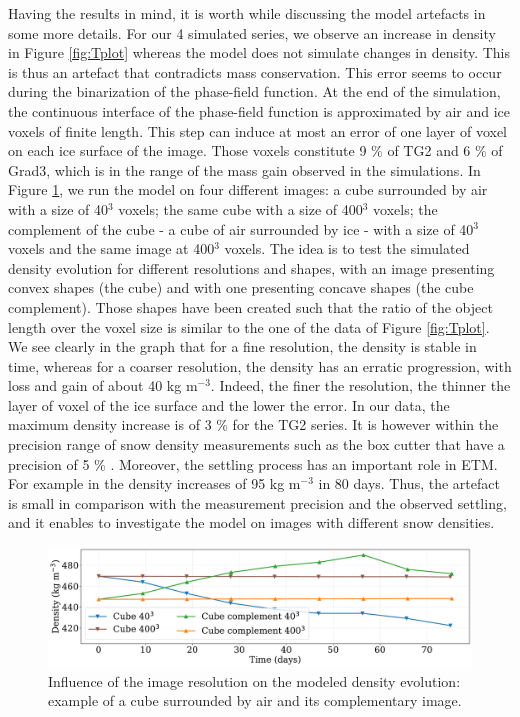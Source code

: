 \documentclass[draft,ms]{agujournal2019}
\begin{document}
Having the results in mind, it is worth while discussing the model artefacts in some more details. 
For our 4 simulated series, we observe an increase in density in Figure \ref{fig:Tplot} whereas the model does not simulate changes in density. This is thus an artefact that contradicts mass conservation. This error seems to occur during the binarization of the phase-field function. At the end of the simulation, the continuous interface of the phase-field function is approximated by air and ice voxels of finite length. This step can induce at most an error of one layer of voxel on each ice surface of the image. Those voxels constitute 9 \% of TG2 and 6 \% of Grad3, which is in the range of the mass gain observed in the simulations. In Figure \ref{fig:cubes}, we run the model on four different images: a cube surrounded by air with a size of 40$^3$ voxels; the same cube with a size of 400$^3$ voxels; the complement of the cube - a cube of air surrounded by ice - with a size of 40$^3$ voxels and the same image at 400$^3$ voxels. The idea is to test the simulated density evolution for different resolutions and shapes, with an image presenting convex shapes (the cube) and with one presenting concave shapes (the cube complement). Those shapes have been created such that the ratio of the object length over the voxel size is similar to the one of the data of Figure \ref{fig:Tplot}. We see clearly in the graph that for a fine resolution, the density is stable in time, whereas for a coarser resolution, the density has an erratic progression, with loss and gain of about 40 kg m$^{-3}$. Indeed, the finer the resolution, the thinner the layer of voxel of the ice surface and the lower the error. %
In our data, the maximum density increase is of 3 \% for the TG2 series. It is however within the precision range of snow density measurements such as the box cutter that have a precision of 5 \% \cite{proksch2016intercomparison}. Moreover, the settling process has an important role in ETM. For example in  the density increases of 95 kg m$^{-3}$ in 80 days. Thus, the artefact is small in comparison with the measurement precision and the observed settling, and it enables to investigate the model on images with different snow densities.\\
\begin{figure}
    \centering
    \includegraphics[width=0.9\linewidth]{Figures/cubes_compl_density_propre.pdf}
    \caption{Influence of the image resolution on the modeled density evolution: example of a cube surrounded by air and its complementary image.}
    \label{fig:cubes}
\end{figure}
\end{document}
